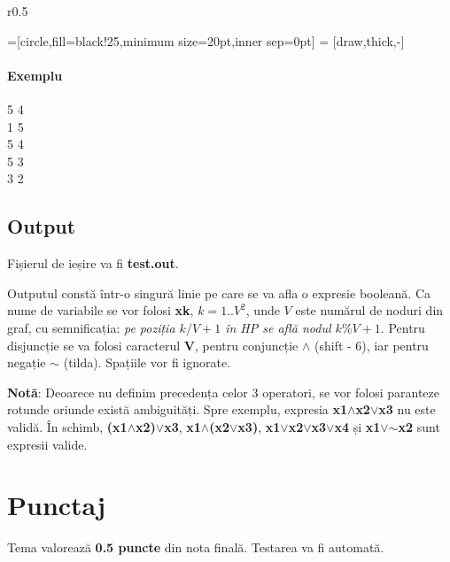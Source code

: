 \documentclass[12pt]{article}
\begin{document}
\begin{wrapfigure}{r}{0.5\textwidth}
  \raggedright
  =[circle,fill=black!25,minimum size=20pt,inner sep=0pt]
   = [draw,thick,-]

\end{wrapfigure}

\paragraph{Exemplu}\mbox{}\par
5 4\\
1 5\\
5 4\\
5 3\\
3 2

\subsection{Output}
Fișierul de ieșire va fi {\bf test.out}.

Outputul constă într-o singură linie pe care se va afla o expresie booleană.
Ca nume de variabile se vor folosi {\bf xk}, $k = 1..V^2$, unde $V$
este numărul de noduri din graf, cu semnificația: \emph{pe poziția $k/V + 1$ în
HP se află nodul $k\%V + 1$}.
Pentru disjuncție se va folosi caracterul {\bf V}, pentru conjuncție
{\bf $\wedge$} (shift - 6), iar pentru negație {\bf $\sim$} (tilda).
Spațiile vor fi ignorate.

{\bf Notă}: Deoarece nu definim precedența celor 3 operatori,
se vor folosi paranteze rotunde oriunde există ambiguități. Spre exemplu,
expresia {\bf x1$\wedge$x2$\vee$x3} nu este validă. În schimb,
{\bf (x1$\wedge$x2)$\vee$x3}, {\bf x1$\wedge$(x2$\vee$x3)},
{\bf x1$\vee$x2$\vee$x3$\vee$x4} și {\bf x1$\vee$$\sim$x2} sunt expresii valide.

\section{Punctaj}
Tema valorează {\bf 0.5 puncte} din nota finală. Testarea va fi automată.
\end{document}

